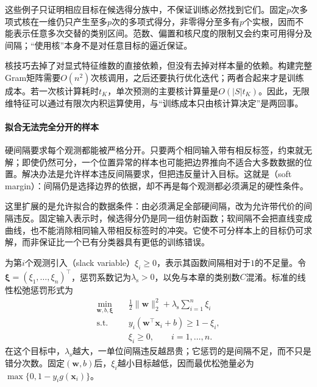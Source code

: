 这些例子只证明相应目标在候选得分族中，不保证训练必然找到它们。固定$p$次多项式核在一维仍只产生至多$p$次的多项式得分，非零得分至多有$p$个实根，因而不能表示任意多次交替的类别区间。范数、偏置和核尺度的限制又会约束可用得分及间隔；“使用核”本身不是对任意目标的逼近保证。

核技巧去掉了对显式特征维数的直接依赖，但没有去掉对样本量的依赖。构建完整Gram矩阵需要$O(n^2)$次核调用，之后还要执行优化迭代；两者合起来才是训练成本。若一次核计算耗时$t_K$，单次预测的主要核计算量是$O(|S|t_K)$。因此，无限维特征可以通过有限次内积运算使用，与“训练成本只由核计算决定”是两回事。

\paragraph{拟合无法完全分开的样本}
\label{sec:classification-svm-soft-margin}

硬间隔要求每个观测都能被严格分开。只要两个相同输入带有相反标签，约束就无解；即使仍然可分，一个位置异常的样本也可能把边界推向不适合大多数数据的位置。解决办法是允许样本违反间隔要求，但把违反量计入目标。这就是（soft margin）：间隔仍是选择边界的依据，却不再是每个观测都必须满足的硬性条件。

这里扩展的是允许拟合的数据条件：由必须满足全部硬间隔，改为允许带代价的间隔违反。固定输入表示时，候选得分仍是同一组仿射函数；软间隔不会把直线变成曲线，也不能消除相同输入带相反标签时的冲突。它使不可分样本上的目标仍可求解，而非保证比一个已有分类器具有更低的训练错误。

为第$i$个观测引入（slack variable）$\xi_i\ge0$，表示其函数间隔相对于$1$的不足量。令$\bm{\xi}=(\xi_1,\ldots,\xi_n)^{\top}$，惩罚系数记为$\lambda_{\mathrm{s}}>0$，以免与本章的类别数$C$混淆。标准的线性松弛惩罚形式为
\begin{equation}
  \begin{aligned}
    \min_{\bm{w},b,\bm{\xi}}\quad&
      \frac12\lVert\bm{w}\rVert_2^2
       +\lambda_{\mathrm{s}}\sum_{i=1}^n\xi_i\\
    \text{s.t.}\quad&
      y_i(\bm{w}^{\top}\bm{x}_i+b)\ge1-\xi_i,\\
    &\xi_i\ge0,\qquad i=1,\ldots,n.
  \end{aligned}
  \label{eq:classification-svm-soft-primal}
\end{equation}
在这个目标中，$\lambda_{\mathrm{s}}$越大，一单位间隔违反越昂贵；它惩罚的是间隔不足，而不只是错分次数。固定$(\bm{w},b)$后，$\xi_i$越小目标越低，因而最优松弛量必为$\max\{0,1-y_i g(\bm{x}_i)\}$。

